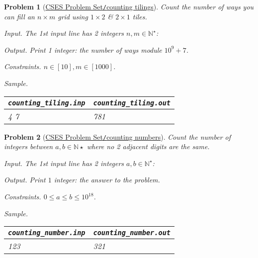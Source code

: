 \documentclass{article}
\newtheorem{problem}{Problem}
\begin{document}
\begin{problem}[\href{https://cses.fi/problemset/task/2181}{CSES Problem Set{\tt/}counting tilings}]
	Count the number of ways you can fill an $n\times m$ grid using $1\times2$ \& $2\times1$ tiles.
	\item {\sf Input.} The 1st input line has 2 integers $n,m\in\mathbb{N}^\star$: 
	\item {\sf Output.} Print 1 integer: the number of ways module $10^9 + 7$.
	\item {\sf Constraints.} $n\in[10],m\in[1000]$.
	\item {\sf Sample.}
	\begin{table}[H]
		\centering
		\begin{tabular}{|l|l|}
			\hline
			\verb|counting_tiling.inp| & \verb|counting_tiling.out| \\
			\hline
			4 7 & 781 \\
			\hline
		\end{tabular}
	\end{table}
\end{problem}

\begin{problem}[\href{https://cses.fi/problemset/task/2220}{CSES Problem Set{\tt/}counting numbers}]
	Count the number of integers between $a,b\in\mathbb{N}\star$ where no 2 adjacent digits are the same.
	\item {\sf Input.} The 1st input line has 2 integers $a,b\in\mathbb{N}^\star$: 
	\item {\sf Output.} Print $1$ integer: the answer to the problem.
	\item {\sf Constraints.} $0\le a\le b\le10^{18}$.
	\item {\sf Sample.}
	\begin{table}[H]
		\centering
		\begin{tabular}{|l|l|}
			\hline
			\verb|counting_number.inp| & \verb|counting_number.out| \\
			\hline
			123 & 321 \\
			\hline
		\end{tabular}
	\end{table}
\end{problem}
\end{document}
